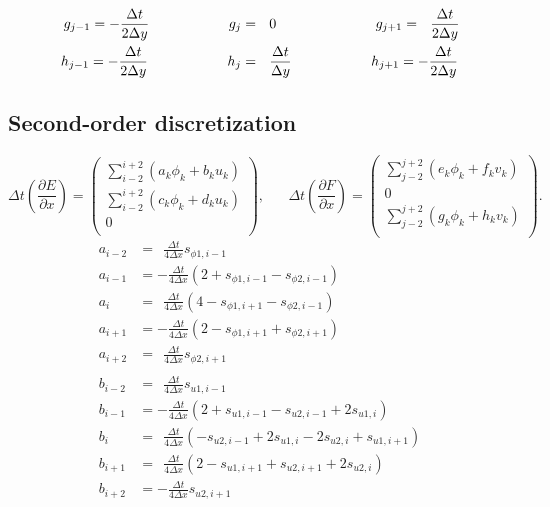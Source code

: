 \documentclass[a4paper]{PRseminar}
\begin{document}
	\begin{align}
		g_{j-1} =-   \frac{\Delta t}{2\Delta y}\hspace{20mm}
		g_{j  }&=\ \ 0                         \hspace{25mm}
		g_{j+1} =\ \ \frac{\Delta t}{2\Delta y}\\
		h_{j-1} =-   \frac{\Delta t}{2\Delta y}\hspace{20mm}
		h_{j  }&=\ \ \frac{\Delta t}{ \Delta y}\hspace{20mm}
		h_{j+1} =-   \frac{\Delta t}{2\Delta y}
	\end{align}

	\clearpage
\subsection{Second-order discretization}
	\begin{equation}
		\Delta t\left(\frac{\partial E}{\partial x}\right)=
		\left(\begin{array}{c}
			\sum_{i-2}^{i+2}\left(a_k\phi_k+b_ku_k\right)  \\
			\sum_{i-2}^{i+2}\left(c_k\phi_k+d_ku_k\right)  \\
			0 \\
		\end{array}\right),
		\hspace{20pt}
		\Delta t\left(\frac{\partial F}{\partial x}\right)=
		\left(\begin{array}{c}
			\sum_{j-2}^{j+2}\left(e_k\phi_k+f_kv_k\right)  \\
			0\\
			\sum_{j-2}^{j+2}\left(g_k\phi_k+h_kv_k\right)  \\
		\end{array}\right).
	\end{equation}
	\begin{align}
		a_{i-2}&=\ \ \frac{\Delta t}{4\Delta x}s_{\phi1,i-1}\nonumber\\
		a_{i-1}&=-   \frac{\Delta t}{4\Delta x}\left(2+s_{\phi1,i-1}-s_{\phi2,i-1}\right)\nonumber\\
		a_{i  }&=\ \ \frac{\Delta t}{4\Delta x}\left(4-s_{\phi1,i+1}-s_{\phi2,i-1}\right)       \\
		a_{i+1}&=-   \frac{\Delta t}{4\Delta x}\left(2-s_{\phi1,i+1}+s_{\phi2,i+1}\right)\nonumber\\
		a_{i+2}&=\ \ \frac{\Delta t}{4\Delta x}s_{\phi2,i+1}\nonumber\\\\
		b_{i-2}&=\ \ \frac{\Delta t}{4\Delta x}s_{u1,i-1}\nonumber\\
		b_{i-1}&=-   \frac{\Delta t}{4\Delta x}\left(2+s_{u1,i-1}-s_{u2,i-1}+2s_{u1,i}\right)\nonumber\\
		b_{i  }&=\ \ \frac{\Delta t}{4\Delta x}\left(-s_{u2,i-1}+2s_{u1,i}-2s_{u2,i}+s_{u1,i+1}\right)       \\
		b_{i+1}&=\ \ \frac{\Delta t}{4\Delta x}\left(2-s_{u1,i+1}+s_{u2,i+1}+2s_{u2,i}\right)\nonumber\\
		b_{i+2}&=-   \frac{\Delta t}{4\Delta x}s_{u2,i+1}\nonumber
	\end{align}
\end{document}
